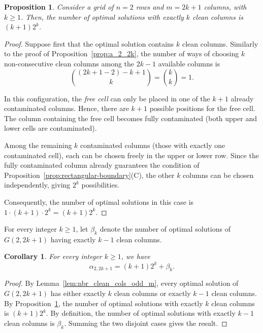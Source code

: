 \documentclass[letterpaper,12pt]{article}
\newtheorem{proposition}{Proposition}
\newtheorem{corollary}{Corollary}
\begin{document}
\begin{proposition}\label{prop:nbr_optimal_solutions_whit_k_clean_cols}
    Consider a grid of $n=2$ rows and $m=2k+1$ columns, with $k \geq 1$.  
    Then, the number of optimal solutions with exactly $k$ clean columns is $(k+1)   2^{k}$.
\end{proposition}

\begin{proof}
    Suppose first that the optimal solution contains $k$ clean columns.  
    Similarly to the proof of Proposition~\ref{prop:a_2_2k}, the number of ways of choosing $k$ non-consecutive clean columns among the $2k-1$ available  columns is
    \[
        \binom{(2k+1-2) - k + 1}{k} 
        = \binom{k}{k} 
        = 1.
    \]

    In this configuration, the \emph{free cell} can only be placed in one of the $k+1$ already contaminated columns. Hence, there are $k+1$ possible positions for the free cell.  
    The column containing the free cell becomes fully contaminated (both upper and lower cells are contaminated).

    Among the remaining $k$ contaminated columns (those with exactly one contaminated cell), each can be chosen freely in the upper or lower row. Since the fully contaminated column already guarantees the condition of Proposition~\ref{prop:rectangular-boundary}(C), the other $k$ columns can be chosen independently, giving $2^{k}$ possibilities.

    Consequently, the number of optimal solutions in this case is $1 \cdot (k+1) \cdot 2^{k} = (k+1)2^{k}$.\qedhere
\end{proof}

 

 
 
For every integer $k\ge 1$, let $\beta_k$ denote the number of optimal solutions of $G(2,2k+1)$
having exactly $k-1$ clean columns.

\begin{corollary}\label{coro:alpha2odd-decomposition}
For every integer $k\ge 1$, we have
\begin{equation}
    \alpha_{2,2k+1}=(k+1)2^k+\beta_k.
\end{equation}
\end{corollary}

\begin{proof}
By Lemma~\ref{lem:nbr_clean_cols_odd_m}, every optimal solution of $G(2,2k+1)$ has either exactly $k$ clean columns
or exactly $k-1$ clean columns. By Proposition~\ref{prop:nbr_optimal_solutions_whit_k_clean_cols}, the number of optimal solutions with exactly
$k$ clean columns is $(k+1)2^k$. By definition, the number of optimal solutions with exactly
$k-1$ clean columns is $\beta_k$. Summing the two disjoint cases gives the result. 
\end{proof}
\end{document}
